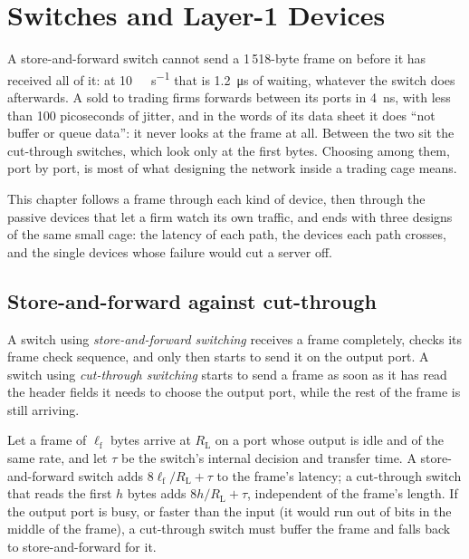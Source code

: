 \chapter{Switches and Layer-1 Devices}\label{ch:nw:switches-and-layer-1-devices}

A store-and-forward switch cannot send a 1\,518-byte frame on before it has received all of it: at
\qty{10}{\giga\bit\per\second} that is \qty{1.2}{\micro\second} of waiting, whatever the switch does afterwards. A 
sold to trading firms forwards between its ports in \qty{4}{\nano\second}, with less than 100 picoseconds of jitter, and in the
words of its data sheet it does ``not buffer or queue data'': it never looks at the frame at all. Between the two sit the
cut-through switches, which look only at the first bytes. Choosing among them, port by port, is most of what designing the
network inside a trading cage means.

This chapter follows a frame through each kind of device, then through the passive devices that let a firm watch its own
traffic, and ends with three designs of the same small cage: the latency of each path, the devices each path crosses, and the
single devices whose failure would cut a server off.

\section{Store-and-forward against cut-through}

\begin{definition}\label{def:nw:switches-and-layer-1-devices:modes}
A switch using \emph{store-and-forward switching} receives a frame completely, checks its
frame check sequence, and only then starts to send it on the output port. A switch using \emph{cut-through
switching} starts to send a frame as soon as it has read the header fields it needs to choose the
output port, while the rest of the frame is still arriving.
\end{definition}

\begin{proposition}\label{prop:nw:switches-and-layer-1-devices:add}
Let a frame of $\ell_{\mathrm f}$ bytes arrive at $R_{\mathrm L}$ on a port whose output is idle and of the same rate, and let
$\tau$ be the switch's internal decision and transfer time. A store-and-forward switch adds
$8\ell_{\mathrm f}/R_{\mathrm L} + \tau$ to the frame's latency; a cut-through switch that reads the first $h$ bytes adds
$8h/R_{\mathrm L} + \tau$, independent of the frame's length. If the output port is busy, or faster than the input (it would
run out of bits in the middle of the frame), a cut-through switch must buffer the frame and falls back to store-and-forward for
it.
\end{proposition}

